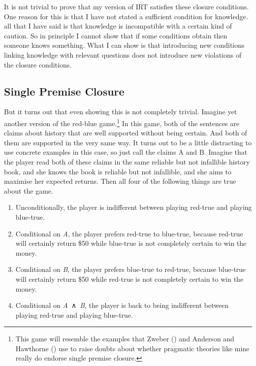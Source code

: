 \documentclass[
  12pt,
  letterpaper,
]{scrbook}
\providecommand{\tightlist}{%
  \setlength{\itemsep}{0pt}\setlength{\parskip}{0pt}}\usepackage{longtable,booktabs,array}
\begin{document}
It is not trivial to prove that my version of IRT satisfies these
closure conditions. One reason for this is that I have not stated a
sufficient condition for knowledge. all that I have said is that
knowledge is incompatible with a certain kind of caution. So in
principle I cannot show that if some conditions obtain then someone
knows something. What I can show is that introducing new conditions
linking knowledge with relevant questions does not introduce new
violations of the closure conditions.

\subsection{Single Premise Closure}\label{sec-andelim}

But it turns out that even showing this is not completely trivial.
Imagine yet another version of the red-blue game.\footnote{This game
  will resemble the examples that Zweber
  () and Anderson and Hawthorne
  () use to raise doubts
  about whether pragmatic theories like mine really do endorse single
  premise closure.} In this game, both of the sentences are claims about
history that are well supported without being certain. And both of them
are supported in the very same way. It turns out to be a little
distracting to use concrete examples in this case, so just call the
claims A and B. Imagine that the player read both of these claims in the
same reliable but not infallible history book, and she knows the book is
reliable but not infallible, and she aims to maximise her expected
returns. Then all four of the following things are true about the game.

\begin{enumerate}
\def\labelenumi{\arabic{enumi}.}
\tightlist
\item
  Unconditionally, the player is indifferent between playing red-true
  and playing blue-true.
\item
  Conditional on \emph{A}, the player prefers red-true to blue-true,
  because red-true will certainly return \$50 while blue-true is not
  completely certain to win the money.
\item
  Conditional on \emph{B}, the player prefers blue-true to red-true,
  because blue-true will certainly return \$50 while red-true is not
  completely certain to win the money.
\item
  Conditional on \emph{A}~∧~\emph{B}, the player is back to being
  indifferent between playing red-true and playing blue-true.
\end{enumerate}
\end{document}
